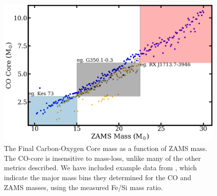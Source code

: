 \documentclass[twocolumn]{aastex631}
\begin{document}
\begin{figure}[hbt!]
    \centering
    \includegraphics[scale=0.25]{COmass.png}
    \caption{The Final Carbon-Oxygen Core mass as a function of ZAMS mass. The CO-core is insensitive to mass-loss, unlike many of the other metrics described. We have included example data from \citet{katsuda}, which indicate the major mass bins they determined for the CO and ZAMS masses, using the measured Fe/Si mass ratio.}
    \label{fig:COc}
\end{figure}
\end{document}
